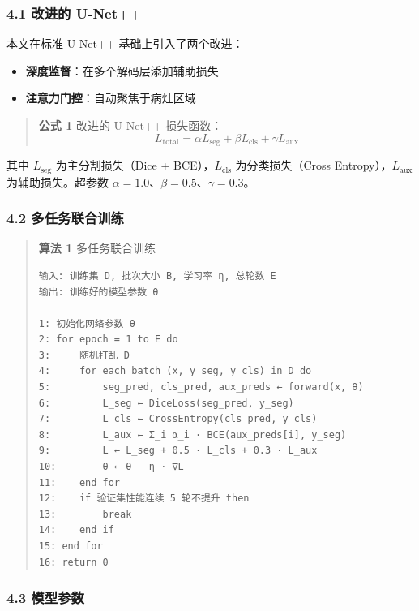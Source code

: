 \documentclass{harryopo-mathnotes}
\begin{document}
\subsubsection{4.1 改进的 U-Net++}\label{ux6539ux8fdbux7684-u-net}

本文在标准 U-Net++ 基础上引入了两个改进：

\begin{itemize}
\tightlist
\item
  \textbf{深度监督}：在多个解码层添加辅助损失
\item
  \textbf{注意力门控}：自动聚焦于病灶区域
\end{itemize}

\begin{quote}
\textbf{公式 1} 改进的 U-Net++ 损失函数：
\[L_{\text{total}} = \alpha L_{\text{seg}} + \beta L_{\text{cls}} + \gamma L_{\text{aux}}\]
\end{quote}

其中 \(L_{\text{seg}}\) 为主分割损失（Dice + BCE），\(L_{\text{cls}}\)
为分类损失（Cross Entropy），\(L_{\text{aux}}\) 为辅助损失。超参数
\(\alpha = 1.0\)、\(\beta = 0.5\)、\(\gamma = 0.3\)。

\subsubsection{4.2
多任务联合训练}\label{ux591aux4efbux52a1ux8054ux5408ux8badux7ec3}

\begin{quote}
\textbf{算法 1} 多任务联合训练

\begin{verbatim}
输入: 训练集 D, 批次大小 B, 学习率 η, 总轮数 E
输出: 训练好的模型参数 θ

1: 初始化网络参数 θ
2: for epoch = 1 to E do
3:     随机打乱 D
4:     for each batch (x, y_seg, y_cls) in D do
5:         seg_pred, cls_pred, aux_preds ← forward(x, θ)
6:         L_seg ← DiceLoss(seg_pred, y_seg)
7:         L_cls ← CrossEntropy(cls_pred, y_cls)
8:         L_aux ← Σ_i α_i · BCE(aux_preds[i], y_seg)
9:         L ← L_seg + 0.5 · L_cls + 0.3 · L_aux
10:        θ ← θ - η · ∇L
11:    end for
12:    if 验证集性能连续 5 轮不提升 then
13:        break
14:    end if
15: end for
16: return θ
\end{verbatim}
\end{quote}

\subsubsection{4.3 模型参数}\label{ux6a21ux578bux53c2ux6570}
\end{document}
